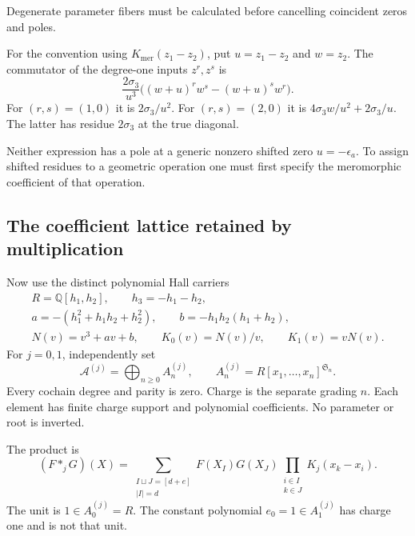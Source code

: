 Degenerate parameter fibers must be calculated before cancelling
coincident zeros and poles.

For the convention using $K_{\mathrm{mer}}(z_1-z_2)$, put
$u=z_1-z_2$ and $w=z_2$.
The commutator of the degree-one inputs $z^r,z^s$ is
\[
 \frac{2\sigma_3}{u^3}
   \bigl((w+u)^rw^s-(w+u)^sw^r\bigr).
\]
For $(r,s)=(1,0)$ it is $2\sigma_3/u^2$.
For $(r,s)=(2,0)$ it is
$4\sigma_3w/u^2+2\sigma_3/u$.
The latter has residue $2\sigma_3$ at the true diagonal.

Neither expression has a pole at a generic nonzero shifted zero
$u=-\epsilon_a$.
To assign shifted residues to a geometric operation one must first
specify the meromorphic coefficient of that operation.

\subsection{The coefficient lattice retained by multiplication}

Now use the distinct polynomial Hall carriers
\begin{equation}\label{eq:vol2-hall-ring}
\begin{gathered}
 R=\mathbb Q[h_1,h_2],\qquad h_3=-h_1-h_2,\\
 a=-(h_1^2+h_1h_2+h_2^2),\qquad
 b=-h_1h_2(h_1+h_2),\\
 N(v)=v^3+av+b,\qquad
 K_0(v)=N(v)/v,\qquad K_1(v)=vN(v).
\end{gathered}
\end{equation}
For $j=0,1$, independently set
\[
 \mathcal A^{(j)}=\bigoplus_{n\ge0}A_n^{(j)},\qquad
 A_n^{(j)}=R[x_1,\ldots,x_n]^{\mathfrak S_n}.
\]
Every cochain degree and parity is zero.
Charge is the separate grading $n$. Each element has finite charge
support and polynomial coefficients.
No parameter or root is inverted.

The product is
\begin{equation}\label{eq:vol2-hall-shuffle}
 (F*_jG)(X)
 =\sum_{\substack{I\sqcup J=[d+e]\\ |I|=d}}
     F(X_I)G(X_J)
       \prod_{\substack{i\in I\\ k\in J}}K_j(x_k-x_i).
\end{equation}
The unit is $1\in A_0^{(j)}=R$.
The constant polynomial $e_0=1\in A_1^{(j)}$ has charge one and
is not that unit.

